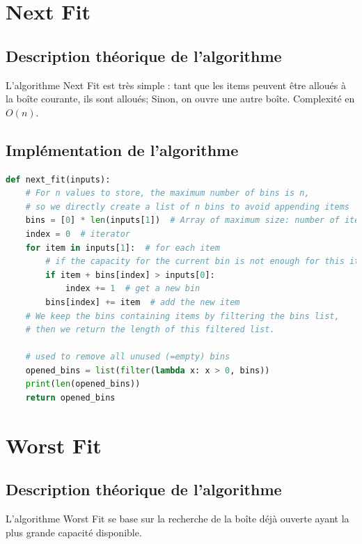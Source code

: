 \documentclass{article}
\begin{document}
\section{Next Fit}

\subsection{Description théorique de l'algorithme}
L'algorithme Next Fit est très simple : tant que les items peuvent être alloués à la boîte courante, ils sont alloués; Sinon, on ouvre une autre boîte.
Complexité en $O(n)$.

\subsection{Implémentation de l'algorithme}
\begin{lstlisting}[language=Python, frame=single]
def next_fit(inputs):
    # For n values to store, the maximum number of bins is n,
    # so we directly create a list of n bins to avoid appending items
    bins = [0] * len(inputs[1])  # Array of maximum size: number of items
    index = 0  # iterator
    for item in inputs[1]:  # for each item
        # if the capacity for the current bin is not enough for this item
        if item + bins[index] > inputs[0]:
            index += 1  # get a new bin
        bins[index] += item  # add the new item
    # We keep the bins containing items by filtering the bins list,
    # then we return the length of this filtered list.

    # used to remove all unused (=empty) bins
    opened_bins = list(filter(lambda x: x > 0, bins))
    print(len(opened_bins))
    return opened_bins
\end{lstlisting}



\section{Worst Fit}

\subsection{Description théorique de l'algorithme}
L'algorithme Worst Fit se base sur la recherche de la boîte déjà ouverte ayant la plus grande capacité disponible.
\end{document}
